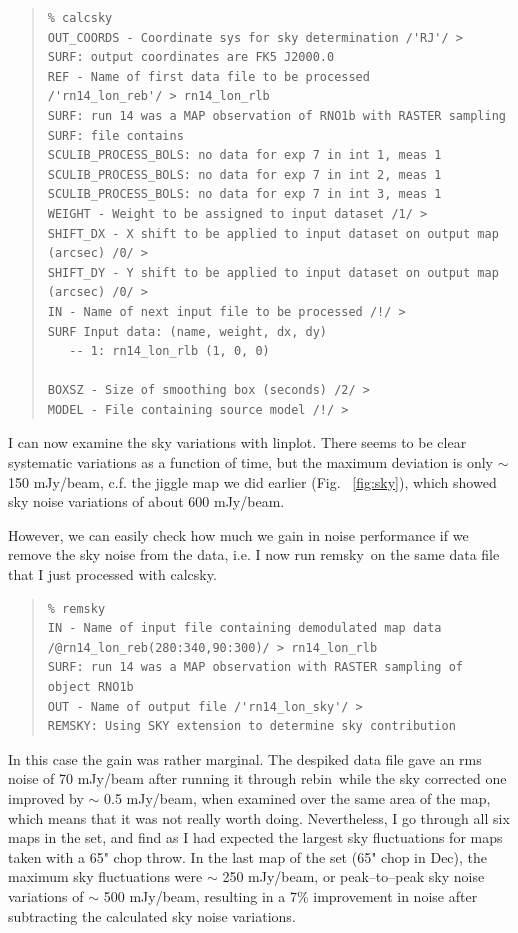 \documentclass[twoside,11pt]{article}
\newenvironment{myquote}{\begin{quote}\begin{small}}{\end{small}\end{quote}}
\newcommand{\task}[1]{\textsf{#1}}
\newcommand{\rebin}{\xref{\task{rebin}}{sun216}{REBIN}}
\newcommand{\calcsky}{\xref{\task{calcsky}}{sun216}{CALCSKY}}
\newcommand{\remsky}{\xref{\task{remsky}}{sun216}{REMSKY}}
\newcommand{\linplot}{\xref{\task{linplot}}{sun95}{LINPLOT}}
\newcommand{\xref}[3]{#1}
\renewcommand{\_}{\texttt{\symbol{95}}}
\begin{document}
\begin{myquote}
\begin{verbatim}
% calcsky
OUT_COORDS - Coordinate sys for sky determination /'RJ'/ > 
SURF: output coordinates are FK5 J2000.0
REF - Name of first data file to be processed 
/'rn14_lon_reb'/ > rn14_lon_rlb
SURF: run 14 was a MAP observation of RNO1b with RASTER sampling
SURF: file contains
SCULIB_PROCESS_BOLS: no data for exp 7 in int 1, meas 1
SCULIB_PROCESS_BOLS: no data for exp 7 in int 2, meas 1
SCULIB_PROCESS_BOLS: no data for exp 7 in int 3, meas 1
WEIGHT - Weight to be assigned to input dataset /1/ > 
SHIFT_DX - X shift to be applied to input dataset on output map (arcsec) /0/ > 
SHIFT_DY - Y shift to be applied to input dataset on output map (arcsec) /0/ > 
IN - Name of next input file to be processed /!/ > 
SURF Input data: (name, weight, dx, dy)
   -- 1: rn14_lon_rlb (1, 0, 0)

BOXSZ - Size of smoothing box (seconds) /2/ > 
MODEL - File containing source model /!/ > 
\end{verbatim}
\end{myquote}

I can now examine the sky variations with \linplot. There seems to be
clear systematic variations as a function of time, but the maximum
deviation is only $\sim$ 150 mJy/beam, c.f. the jiggle map we did
earlier (Fig. \ \ref{fig:sky}), which showed sky noise variations of
about 600 mJy/beam.

However, we can easily check how much we gain in noise performance if
we remove the sky noise from the data, i.e. I now run \remsky\ on the
same data file that I just processed with \calcsky.

\begin{myquote}
\begin{verbatim}
% remsky
IN - Name of input file containing demodulated map data 
/@rn14_lon_reb(280:340,90:300)/ > rn14_lon_rlb
SURF: run 14 was a MAP observation with RASTER sampling of object RNO1b
OUT - Name of output file /'rn14_lon_sky'/ > 
REMSKY: Using SKY extension to determine sky contribution
\end{verbatim}
\end{myquote}

In this case the gain was rather marginal. The despiked data file gave
an rms noise of 70 mJy/beam after running it through \rebin\, while the
sky corrected one improved by $\sim$ 0.5 mJy/beam, when examined over
the same area of the map, which means that it was not really worth
doing. Nevertheless, I go through all six maps in the set, and find as
I had expected the largest sky fluctuations for maps taken with a 65"
chop throw. In the last map of the set (65" chop in Dec), the maximum
sky fluctuations were $\sim$ 250 mJy/beam, or  peak--to--peak sky noise
variations of $\sim$ 500 mJy/beam, resulting in a 7\% improvement in
noise after subtracting the calculated sky noise variations.
\end{document}
